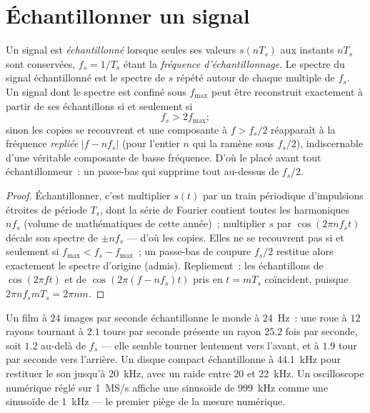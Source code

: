 \section{Échantillonner un signal}

\begin{theorem}\label{thm:b2:feedback-oscillators:shannon}
Un signal est \emph{échantillonné} lorsque seules ses valeurs $s(nT_s)$ aux
instants $nT_s$ sont conservées, $f_s = 1/T_s$ étant la \emph{fréquence d'échantillonnage}.
Le spectre du signal échantillonné est le spectre de $s$ répété
autour de chaque multiple de $f_s$. Un signal dont le spectre est confiné
sous $f_{\max}$ peut être reconstruit exactement à partir de ses échantillons si et
seulement si
\[
f_s > 2f_{\max} ;
\]
sinon les copies se recouvrent et une composante à $f > f_s/2$ réapparaît
à la fréquence \emph{repliée} $|f - nf_s|$ (pour l'entier $n$ qui
la ramène sous $f_s/2$), indiscernable d'une véritable composante de basse
fréquence. D'où le \emph{} placé avant tout
échantillonneur~: un passe-bas qui supprime tout au-dessus de $f_s/2$.
\end{theorem}

\begin{proof}
Échantillonner, c'est multiplier $s(t)$ par un train périodique d'impulsions étroites de
période $T_s$, dont la série de Fourier contient toutes les harmoniques $nf_s$
(volume de mathématiques de cette année)~; multiplier $s$ par $\cos(2\pi nf_st)$
décale son spectre de $\pm nf_s$ --- d'où les copies. Elles ne se
recouvrent pas si et seulement si $f_{\max} < f_s - f_{\max}$~; un passe-bas de coupure $f_s/2$
restitue alors exactement le spectre d'origine (admis). Repliement~: les
échantillons de $\cos(2\pi ft)$ et de $\cos(2\pi(f - nf_s)t)$ pris en $t = mT_s$
coïncident, puisque $2\pi nf_smT_s = 2\pi nm$.
\end{proof}

\begin{example}\label{ex:b2:feedback-oscillators:alias}
Un film à $24$ images par seconde échantillonne le monde à \qty{24}{Hz}~: une
roue à $12$ rayons tournant à $2.1$ tours par seconde présente un rayon
$25.2$ fois par seconde, soit $1.2$ au-delà de $f_s$ --- elle semble tourner lentement
vers l'avant, et à $1.9$ tour par seconde vers l'arrière. Un disque compact échantillonne
à \qty{44.1}{kHz} pour restituer le son jusqu'à \qty{20}{kHz}, avec un  raide entre $20$ et \qty{22}{kHz}. Un oscilloscope numérique
réglé sur \qty{1}{MS/s} affiche une sinusoïde de \qty{999}{kHz} comme une sinusoïde de \qty{1}{kHz} ---
le premier piège de la mesure numérique.
\end{example}

